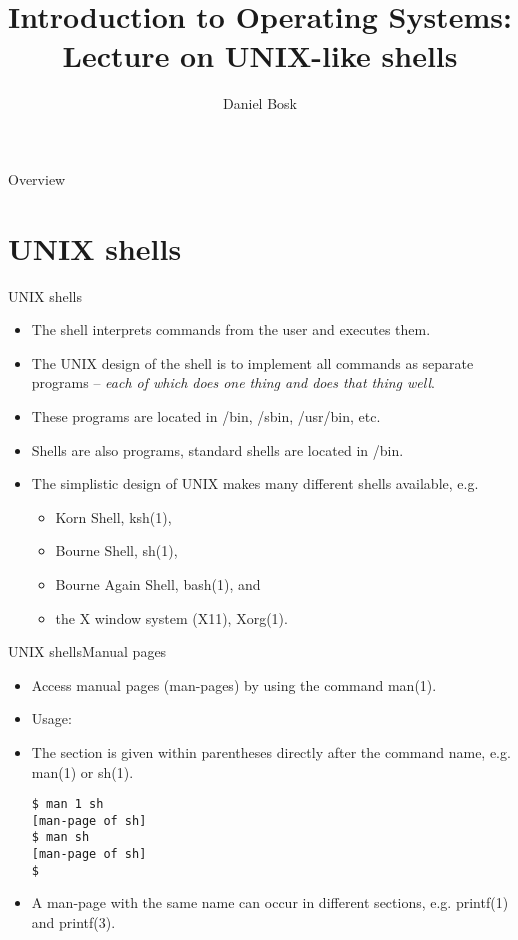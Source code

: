\documentclass{beamer}
\title[UNIX-like shells]{%
	Introduction to Operating Systems:\\
	Lecture on UNIX-like shells
}
\author{Daniel Bosk}
\institute{%
	Department of Information Technology and Media (ITM),\\
	Mid Sweden University, Sundsvall.
}
\date{\svnId}
\begin{document}
\begin{frame}
  \titlepage
\end{frame}

\begin{frame}{Overview}
	\tableofcontents
\end{frame}





\section{UNIX shells}
\begin{frame}{UNIX shells}
	\begin{itemize}
		\item<1> The shell interprets commands from the user and executes them.
		\item<2> The UNIX design of the shell is to implement all commands as 
			separate programs -- \emph{each of which does one thing and does that 
			thing well}.
		\item<3> These programs are located in /bin, /sbin, /usr/bin, etc.
		\item<4> Shells are also programs, standard shells are located in /bin.
		\item<5> The simplistic design of UNIX makes many different shells 
			available, e.g.
			\begin{itemize}
				\item Korn Shell, ksh(1),
				\item Bourne Shell, sh(1),
				\item Bourne Again Shell, bash(1), and
				\item the X window system (X11), Xorg(1).
			\end{itemize}
	\end{itemize}
\end{frame}
\begin{frame}[fragile]{UNIX shells}{Manual pages}
	\begin{itemize}
		\item<1-2> Access manual pages (man-pages) by using the command man(1).
		\item<2> Usage: 
		\item<3> The section is given within parentheses directly after the command 
			name, e.g. man(1) or sh(1).
			\begin{lstlisting}
$ man 1 sh
[man-page of sh]
$ man sh
[man-page of sh]
$
			\end{lstlisting}
		\item<4> A man-page with the same name can occur in different sections, 
			e.g. printf(1) and printf(3).
	\end{itemize}
\end{frame}
\end{document}
